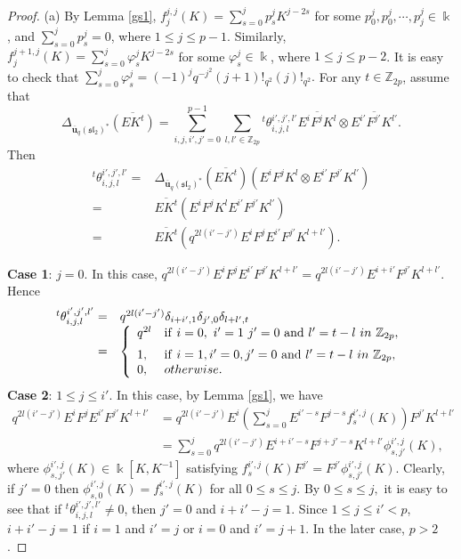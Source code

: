 \documentclass[10pt,oneside]{amsart}
\theoremstyle{definition}
\def\<{\leqslant}
\def\ot{\otimes}
\begin{document}
\begin{proof}
\textup{(a)}
By Lemma \ref{gs1}, $f^{j,j}_j(K)=\sum_{s=0}^jp^j_s K^{j-2s}$ for some $p^j_0,p^j_0,\cdots,p^j_j\in \Bbbk$, and $\sum_{s=0}^jp^j_{s}=0$, where $1\<j\<p-1.$ Similarly, $f^{j+1,j}_j(K)=\sum_{s=0}^j\varphi^j_sK^{j-2s}$ for some $\varphi^j_s\in \Bbbk$, where $1\<j\<p-2$. It is easy to check that $\sum_{s=0}^j\varphi^j_s=(-1)^jq^{-j^2}(j+1)!_{q^2}(j)!_{q^2}.$ For any $t\in \mathbb{Z}_{2p}$, assume that $$\Delta_{\mathbf{\overline{u}}_q(\mathfrak{sl_2})^*}\overline{(EK^t)}=\sum_{i,j,i',j'=0}^{p-1}
\sum_{l,l'\in\mathbb{Z}_{2p} } {^t\theta^{i',j',l'}_{i,j,l}}\overline{E^iF^jK^l}\ot \overline{E^{i'}F^{j'}K^{l'}}.$$
Then $$\begin{array}{rl}
{^t\theta^{i',j',l'}_{i,j,l}}=&\Delta_{\mathbf{\overline{u}}_q(\mathfrak{sl_2})^*}(\overline{EK^t})
({E^iF^jK^l}\ot {E^{i'}F^{j'}K^{l'}})\\
=&\overline{EK^t}(E^iF^jK^lE^{i'}F^{j'}K^{l'})\\
=&\overline{EK^t}(q^{2l(i'-j')}E^iF^jE^{i'}F^{j'}K^{l+l'}).\end{array}$$

{\bf Case 1}: $j=0$. In this case, $q^{2l(i'-j')}E^iF^jE^{i'}F^{j'}K^{l+l'}=
q^{2l(i'-j')}E^{i+i'}F^{j'}K^{l+l'}$.
Hence $$\begin{array}{rl}
{^t\theta^{i',j',l'}_{i,j,l}}
=&q^{2l(i'-j')}\delta_{i+i',1}\delta_{j',0}\delta_{l+l',t}\\
=&\left\{
\begin{array}{ll}
\vspace{0.2cm}
q^{2l}& {\rm if}\ i=0,\ i'=1 \ j'=0 \ {\rm and} \ l'=t-l\ in \ \mathbb{Z}_{2p} ,\\
1, & {\rm if} \ i=1,i'=0,j'=0 \ {\rm and} \ l'=t-l \ in \ \mathbb{Z}_{2p},\\
0, & otherwise.
\end{array}\right.
\end{array}$$
{\bf Case 2}: $1\<j\<i'$. In this case, by Lemma \ref{gs1}, we have
$$\begin{array}{rl}
q^{2l(i'-j')}E^iF^jE^{i'}F^{j'}K^{l+l'}
&=q^{2l(i'-j')}E^i(\sum_{s=0}^{j}E^{i'-s}F^{j-s}f^{i',j}_{s}(K))F^{j'}K^{l+l'}\\
&=\sum_{s=0}^{j}q^{2l(i'-j')}E^{i+i'-s}F^{j+j'-s}K^{l+l'}\phi^{i',j}_{s,j'}(K),\end{array}$$ where $\phi^{i',j}_{s,j'}(K)\in \Bbbk[K,K^{-1}]$ satisfying $f^{i',j}_{s}(K)F^{j'}=F^{j'}\phi^{i',j}_{s,j'}(K)$. Clearly, if $j'=0$ then $\phi^{i',j}_{s,0}(K)=f^{i',j}_s(K)$ for all $0\<s\<j.$ By $0\<s\<j,$ it is easy to see that if ${^t\theta^{i',j',l'}_{i,j,l}}\neq 0$, then $j'=0$ and $i+i'-j=1$. Since $1\<j\<i'<p$, $i+i'-j=1$ if $i=1$ and $i'=j$ or $i=0$ and $i'=j+1$. In the later case, $p>2$.


\end{proof}
\end{document}
